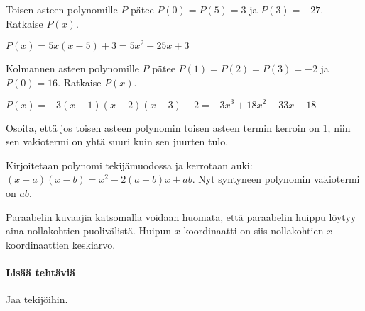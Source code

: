 \begin{tehtavasivu}
\begin{tehtava}
    Toisen asteen polynomille $P$ pätee $P(0)=P(5)=3$ ja $P(3)=-27$. Ratkaise $P(x)$.
    \begin{vastaus}
        $P(x)=5x(x-5)+3=5x^2-25x+3$
    \end{vastaus}
\end{tehtava}

\begin{tehtava}
    Kolmannen asteen polynomille $P$ pätee $P(1)=P(2)=P(3)=-2$ ja $P(0)=16$. Ratkaise $P(x)$.
    \begin{vastaus}
        $P(x)=-3(x-1)(x-2)(x-3)-2=-3x^3+18x^2-33x+18$
    \end{vastaus}
\end{tehtava}

\begin{tehtava}
    Osoita, että jos toisen asteen polynomin toisen asteen termin kerroin on 1, niin sen vakiotermi on yhtä suuri kuin sen juurten tulo.
    \begin{vastaus}
        Kirjoitetaan polynomi tekijämuodossa ja kerrotaan auki: $(x-a)(x-b)=x^2-2(a+b)x+ab$. Nyt syntyneen polynomin vakiotermi on $ab$.
    \end{vastaus}
\end{tehtava}

\begin{tehtava}
    Paraabelin kuvaajia katsomalla voidaan huomata, että paraabelin huippu löytyy aina nollakohtien puolivälistä.
    Huipun $x$-koordinaatti on siis nollakohtien $x$-koordinaattien keskiarvo.
    \begin{alakohdat}
    \end{alakohdat}
    \begin{vastaus}
        \begin{alakohdat}
        \end{alakohdat}
    \end{vastaus}
\end{tehtava}

\paragraph*{Lisää tehtäviä}

\begin{tehtava}
    Jaa tekijöihin.
    \begin{alakohdat}
    \end{alakohdat}
    \begin{vastaus}
        \begin{alakohdat}
        \end{alakohdat}
    \end{vastaus}
\end{tehtava}


\end{tehtavasivu}
